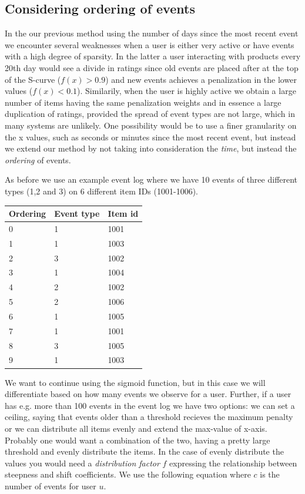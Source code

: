 \subsection{Considering ordering of events}

In the our previous method using the number of days since the most recent event
we encounter several weaknesses when a user is either very active or have
events with a high degree of sparsity. In the latter a user interacting with
products every 20th day would see a divide in ratings since old events are
placed after at the top of the S-curve ($f(x) > 0.9$) and new events achieves a
penalization in the lower values ($f(x) < 0.1$). Similarily, when the user is
highly active we obtain a large number of items having the same penalization
weights and in essence a large duplication of ratings, provided the spread of
event types are not large, which in many systems are unlikely. One possibility
would be to use a finer granularity on the x values, such as seconds or minutes
since the most recent event, but instead we extend our method by not taking
into consideration the \textit{time}, but instead the \textit{ordering} of
events.

As before we use an example event log where we have 10 events of three
different types (1,2 and 3) on 6 different item IDs (1001-1006).

\begin{table}
  \centering
  \label{event-log-sigmoid-count}
  \begin{tabular}{lll}
    \toprule
    Ordering & Event type & Item id \\
    \midrule
    0 & 1 & 1001 \\
    1 & 1 & 1003 \\
    2 & 3 & 1002 \\
    3 & 1 & 1004 \\
    4 & 2 & 1002 \\
    5 & 2 & 1006 \\
    6 & 1 & 1005 \\
    7 & 1 & 1001 \\
    8 & 3 & 1005 \\
    9 & 1 & 1003 \\
    \bottomrule
  \end{tabular}
\end{table}

We want to continue using the sigmoid function, but in this case we will
differentiate based on how many events we observe for a user. Further, if a
user has e.g. more than 100 events in the event log we have two options: we can
set a ceiling, saying that events older than a threshold recieves the maximum
penalty or we can distribute all items evenly and extend the max-value of
x-axis. Probably one would want a combination of the two, having a pretty large
threshold and evenly distribute the items. In the case of evenly distribute the
values you would need a \textit{distribution factor} $f$ expressing the
relationship between steepness and shift coefficients. We use the following
equation where $c$ is the number of events for user $u$.

